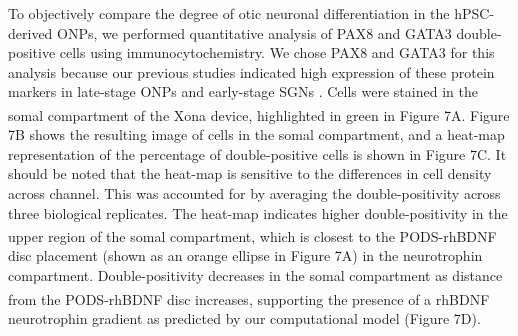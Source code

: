 \documentclass[review]{elsarticle}
\begin{document}
To objectively compare the degree of otic neuronal differentiation in the hPSC-derived ONPs, we performed quantitative analysis of PAX8 and GATA3 double-positive cells using immunocytochemistry. We chose PAX8 and GATA3 for this analysis because our previous studies indicated high expression of these protein markers in late-stage ONPs and early-stage SGNs \cite{Heuer2021,Chang2020, Matsuoka2017}. Cells were stained in the somal compartment of the Xona\textsuperscript{\texttrademark} device, highlighted in green in Figure 7A. Figure 7B shows the resulting image of cells in the somal compartment, and a heat-map representation of the percentage of double-positive cells is shown in Figure 7C.
It should be noted that the heat-map is sensitive to the differences in cell density across channel. This was accounted for by averaging the double-positivity across three biological replicates. The heat-map indicates higher double-positivity in the upper region of the somal compartment, which is closest to the PODS\textsuperscript{\textregistered}-rhBDNF disc placement (shown as an orange ellipse in Figure 7A) in the neurotrophin compartment. Double-positivity decreases in the somal compartment as distance from the PODS\textsuperscript{\textregistered}-rhBDNF disc increases, supporting the presence of a rhBDNF neurotrophin gradient as predicted by our computational model (Figure 7D).
\end{document}
